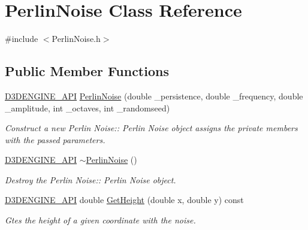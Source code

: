 \hypertarget{class_perlin_noise}{}\section{Perlin\+Noise Class Reference}
\label{class_perlin_noise}


{\ttfamily \#include $<$Perlin\+Noise.\+h$>$}

\subsection*{Public Member Functions}
\begin{DoxyCompactItemize}
\item 
\mbox{\hyperlink{stdafx_8h_a8ee2d990c5dfba7794dd2b60741d7722}{D3\+D\+E\+N\+G\+I\+N\+E\+\_\+\+A\+PI}} \mbox{\hyperlink{class_perlin_noise_a3926062e9211b00fedd72b1b5d02a537}{Perlin\+Noise}} (double \+\_\+persistence, double \+\_\+frequency, double \+\_\+amplitude, int \+\_\+octaves, int \+\_\+randomseed)
\begin{DoxyCompactList}\small\item\em Construct a new Perlin Noise\+:\+: Perlin Noise object assigns the private members with the passed parameters. \end{DoxyCompactList}\item 
\mbox{\hyperlink{stdafx_8h_a8ee2d990c5dfba7794dd2b60741d7722}{D3\+D\+E\+N\+G\+I\+N\+E\+\_\+\+A\+PI}} \mbox{\hyperlink{class_perlin_noise_a39f323fb44aaf9a9e4450ef49798117a}{$\sim$\+Perlin\+Noise}} ()
\begin{DoxyCompactList}\small\item\em Destroy the Perlin Noise\+:\+: Perlin Noise object. \end{DoxyCompactList}\item 
\mbox{\hyperlink{stdafx_8h_a8ee2d990c5dfba7794dd2b60741d7722}{D3\+D\+E\+N\+G\+I\+N\+E\+\_\+\+A\+PI}} double \mbox{\hyperlink{class_perlin_noise_a1eea20ff062778d6668b32f1d75a8e2a}{Get\+Height}} (double x, double y) const
\begin{DoxyCompactList}\small\item\em Gtes the height of a given coordinate with the noise. \end{DoxyCompactList}\end{DoxyCompactItemize}
